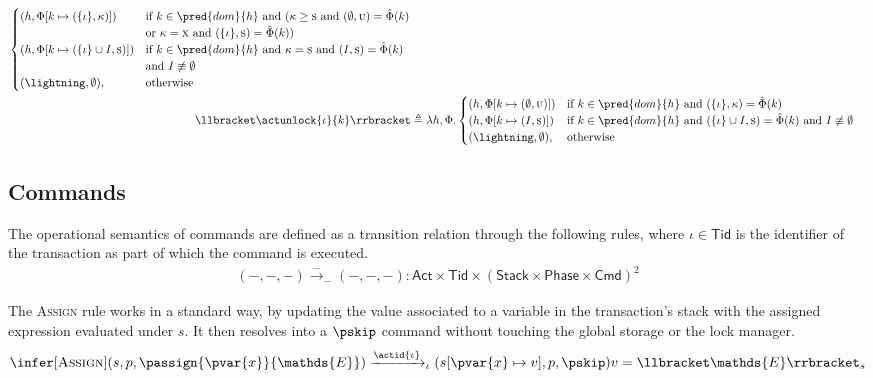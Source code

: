 \begin{align*}
\begin{cases}
(h, \Phi[k \mapsto (\{\iota\}, \kappa)]) & \text{if } k \in \pred{dom}{h} \text{ and } ( \kappa \geq \textsc{s} \text{ and } (\emptyset, \textsc{u}) = \hat{\Phi}(k) \\
& \text{or } \kappa = \textsc{x} \text{ and } (\{\iota\}, \textsc{s}) = \hat{\Phi}(k) ) \\
(h, \Phi[k \mapsto (\{\iota\} \cup I, \textsc{s})]) & \text{if } k \in \pred{dom}{h} \text{ and } \kappa = \textsc{s} \text{ and } (I, \textsc{s}) = \hat{\Phi}(k) \\
& \text{and } I \not\equiv \emptyset \\
(\lightning, \emptyset), & \text{otherwise}
\end{cases} \\
\llbracket \actunlock{\iota}{k} \rrbracket &\triangleq \lambda h, \Phi \ldotp
\begin{cases}
(h, \Phi[k \mapsto (\emptyset, \textsc{u})]) & \text{if } k \in \pred{dom}{h} \text{ and } (\{\iota\}, \kappa) = \hat{\Phi}(k) \\
(h, \Phi[k \mapsto (I, \textsc{s})]) & \text{if } k \in \pred{dom}{h} \text{ and } (\{\iota\} \cup I, \textsc{s}) = \hat{\Phi}(k) \text{ and } I \not\equiv \emptyset \\
(\lightning, \emptyset), & \text{otherwise}
\end{cases}
\end{align*}

\subsection{Commands}

The operational semantics of commands are defined as a transition relation through the following rules, where $\iota \in \mathsf{Tid}$ is the identifier of the transaction as part of which the command is executed.
\begin{gather*}
(-, -, -) \xrightarrow{-}_- (-, -, -) 
: \mathsf{Act} \times \mathsf{Tid} \times (\mathsf{Stack} \times \mathsf{Phase} \times \mathsf{Cmd})^2
\end{gather*}

The \textsc{Assign} rule works in a standard way, by updating the value associated to a variable in the transaction's stack with the assigned expression evaluated under $s$. It then resolves into a $\pskip$ command without touching the global storage or the lock manager.
\[
\infer[\textsc{Assign}]
{
	(s, p, \passign{\pvar{x}}{\mathds{E}})
	\xrightarrow{\actid{\iota}}_\iota
	(s[\pvar{x} \mapsto v], p, \pskip)
}
{
	v = \llbracket \mathds{E} \rrbracket_s
}
\]

